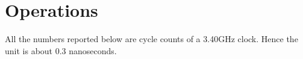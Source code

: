 \section{Operations}
All the numbers reported below are cycle counts of a 3.40GHz clock.
Hence the unit is about 0.3 nanoseconds.



